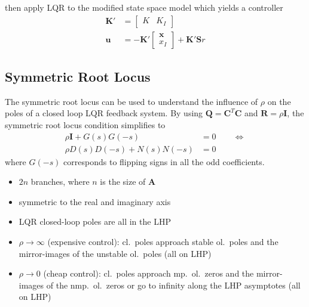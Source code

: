 then apply LQR to the modified state space model which yields a controller
\begin{align*}
    \mathbf{K}' & =\begin{bmatrix}
                       K & K_I
                   \end{bmatrix}                            \\
    \mathbf{u}  & =-\mathbf{K}'\begin{bmatrix}
                                   \mathbf{x} \\
                                   x_I
                               \end{bmatrix} + \mathbf{K'S}r
\end{align*}

\subsection{Symmetric Root Locus}
The symmetric root locus can be used to understand the influence of $\rho$ on the poles of a closed loop LQR feedback system.
By using $\mathbf{Q}=\mathbf{C}^T \mathbf{C}$ and $\mathbf{R}=\rho \mathbf{I}$, the symmetric root locus condition simplifies to
\noindent\begin{align*}
    \rho \mathbf{I}+G(s)G(-s) & =0 \qquad \Leftrightarrow \\
    \rho D(s)D(-s)+N(s)N(-s)  & =0
\end{align*}
where $G(-s)$ corresponds to flipping signs in all the odd coefficients.

\begin{itemize}
    \item $2n$ branches, where $n$ is the size of $\mathbf{A}$
    \item symmetric to the real and imaginary axis
    \item LQR closed-loop poles are all in the LHP
    \item $\rho \rightarrow \infty$ (expensive control):\newline
          cl.\ poles approach stable ol.\ poles and the mirror-images of the unstable ol.\ poles (all on LHP)
    \item $\rho \rightarrow 0$ (cheap control):\newline
          cl.\ poles approach mp.\ ol.\ zeros and the mirror-images of the nmp.\ ol.\ zeros or go to infinity along the LHP asymptotes (all on LHP)
\end{itemize}

